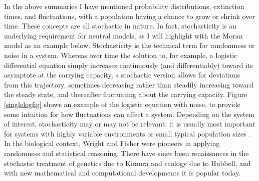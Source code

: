 In the above summaries I have mentioned probability distributions, extinction times, and fluctuations, with a population having a chance to grow or shrink over time. 
These concepts are all stochastic in nature. 
In fact, stochasticity is an underlying requirement for neutral models, as I will highlight with the Moran model as an example below. 
Stochasticity is the technical term for randomness or noise in a system. %
Whereas over time the solution to, for example, a logistic differential equation simply increases continuously (and differentiably) toward its asymptote at the carrying capacity, a stochastic version allows for deviations from this trajectory, sometimes decreasing rather than steadily increasing toward the steady state, and thereafter fluctuating about the carrying capacity. 
Figure \ref{singlelogfig} shows an example of the logistic equation with noise, to provide some intuition for how fluctuations can affect a system. 
Depending on the system of interest, stochasticity may or may not be relevant: it is usually most important for systems with highly variable environments or small typical population sizes \cite{Nisbet1982,Kimura1983,VanKampen1992,Gardiner2004,Blythe2007,Ovaskainen2010,Black2012}. 
In the biological context, Wright and Fisher were pioneers in applying randomness and statistical reasoning. %
There have since been renaissances in the stochastic treatment of genetics due to Kimura and ecology due to Hubbell, and with new mathematical and computational developments it is popular today. %

